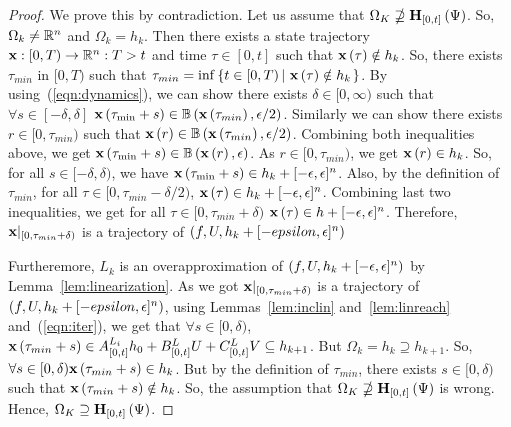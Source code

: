 \begin{proof}
We prove this by contradiction.  Let us assume that
$\Omega_K\nsupseteq \mathbf{H}_{[0,t]}\left(\Psi\right)$.  So,
$\Omega_k\neq\mathbb{R}^n$ and $\Omega_k = h_k$.  Then there exists a
state trajectory $\mathbf{x}:[0,T)\rightarrow\mathbb{R}^n:T>t$ and time
$\tau\in[0,t]$ such that $\mathbf{x}\left(\tau\right)\notin h_k$.  So, there exists
$\tau_{min}$ in $[0,T)$ such that $\tau_{min}
= \inf\left\{t\in[0,T)\left|~\mathbf{x}\left(\tau\right)\notin h_k\right.\right\}$.  By
using~(\ref{eqn:dynamics}), we can show there exists
$\delta\in[0,\infty)$ such that $\forall s\in[-\delta,\delta]$
$\mathbf{x}\left(\tau_{\min}+s\right)\in \mathbb{B}\left(\mathbf{x}\left(\tau_{min}\right),\epsilon/2\right)$.
Similarly we can show there exists $r\in[0,\tau_{min})$ such that
$\mathbf{x}\left(r\right)\in \mathbb{B}\left(\mathbf{x}\left(\tau_{min}\right),\epsilon/2\right)$.  Combining both
inequalities above, we get
$\mathbf{x}\left(\tau_{\min}+s\right)\in \mathbb{B}\left(\mathbf{x}\left(r\right),\epsilon\right)$.  As
$r\in[0,\tau_{min})$, we get $\mathbf{x}\left(r\right)\in h_k$.  So, for all
$s\in[-\delta,\delta)$, we have $\mathbf{x}\left(\tau_{\min}+s\right)\in h_k +
[-\epsilon,\epsilon]^n$.  Also, by the definition of $\tau_{min}$, for
all $\tau\in[0,\tau_{min}-\delta/2)$, $\mathbf{x}\left(\tau\right)\in h_k +
[-\epsilon,\epsilon]^n$. Combining last two inequalities, we get for
all $\tau\in[0,\tau_{min}+\delta)$ $\mathbf{x}\left(\tau\right)\in h +
[-\epsilon,\epsilon]^n$.  Therefore,
$\mathbf{x}|_{[0,\tau_{min}+\delta)}$ is a trajectory of
$\left(f,U,h_k+[-epsilon,\epsilon]^n\right)$

Furtheremore, $L_k$ is an overapproximation of
$\left(f,U,h_k+[-\epsilon,\epsilon]^n\right)$ by
Lemma~\ref{lem:linearization}.  As we got
$\mathbf{x}|_{[0,\tau_{min}+\delta)}$ is a trajectory of
$\left(f,U,h_k+[-epsilon,\epsilon]^n\right)$, using
Lemmas~\ref{lem:inclin} and~\ref{lem:linreach} and~(\ref{eqn:iter}),
we get that $\forall s\in [0,\delta)$,
$\mathbf{x}\left(\tau_{min}+s\right)\in {A}^{L_i}_{[0,t]}h_0
+ {B}^{L}_{[0,t]}U
+ {C}^{L}_{[0,t]}V \subseteq h_{k+1}$.  But
$\Omega_k=h_k\supseteq h_{k+1}$.  So, $\forall s\in
[0,\delta)\mathbf{x}\left(\tau_{min}+s\right)\in h_k$.  But by the definition of
$\tau_{min}$, there exists $s\in[0,\delta)$ such that
$\mathbf{x}\left(\tau_{min}+s\right)\notin h_k$.  So, the assumption that
$\Omega_K\nsupseteq \mathbf{H}_{[0,t]}\left(\Psi\right)$ is wrong.  Hence,
$\Omega_K\supseteq \mathbf{H}_{[0,t]}\left(\Psi\right)$.
\end{proof}
%
